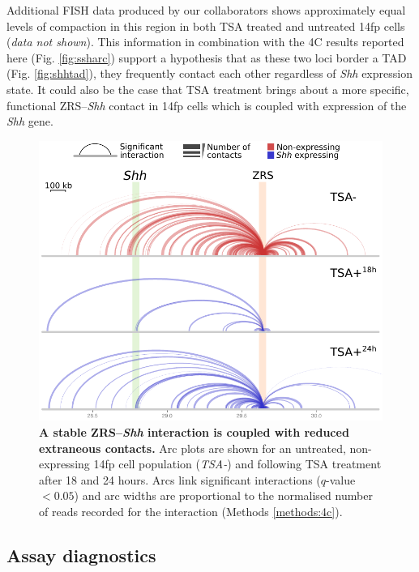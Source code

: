 \documentclass[a4paper,11pt,oneside]{book}
\begin{document}
Additional FISH data produced by our collaborators shows approximately equal levels of compaction in this region in both TSA treated and untreated 14fp cells (\emph{data not shown}). This information in combination with the 4C results reported here (Fig. \ref{fig:ssharc}) support a hypothesis that as these two loci border a TAD (Fig. \ref{fig:shhtad}), they frequently contact each other regardless of \emph{Shh} expression state. It could also be the case that TSA treatment brings about a more specific, functional ZRS--\emph{Shh} contact in 14fp cells which is coupled with expression of the \emph{Shh} gene.

\begin{figure}
\begin{center} 
\includegraphics[width=4.6in]{4cArcs_v2.pdf}
\captionsetup{width=\textwidth} 
\caption[ A stable ZRS--\emph{Shh} interaction is coupled with reduced extraneous contacts. ]{ {\bf A stable ZRS--\emph{Shh} interaction is coupled with reduced extraneous contacts. }
Arc plots are shown for an untreated, non-expressing 14fp cell population (\emph{TSA-}) and following TSA treatment after 18 and 24 hours. Arcs link significant interactions ($q$-value $< 0.05$) and arc widths are proportional to the normalised number of reads recorded for the interaction (Methods \ref{methods:4c}).
}\label{fig:4carcs}
\end{center} 
\end{figure} 

\subsection{Assay diagnostics}
\end{document}
